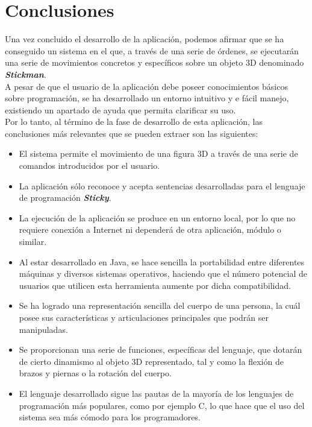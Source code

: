\chapter{Conclusiones}
Una vez concluido el desarrollo de la aplicación, podemos afirmar que se ha conseguido un sistema en el que, a través de una 
serie de órdenes, se ejecutarán una serie de movimientos concretos y específicos sobre un objeto 3D denominado \textbf{\textit{Stickman}}.\\

A pesar de que el usuario de la aplicación debe poseer conocimientos básicos sobre programación, se ha desarrollado un entorno 
intuitivo y e fácil manejo, existiendo un apartado de ayuda que permita clarificar su uso.\\

Por lo tanto, al término de la fase de desarrollo de esta aplicación, las conclusiones más relevantes que se pueden extraer son las siguientes:
\begin{itemize}
   \item El sistema permite el movimiento de una figura 3D a través de una serie de comandos introducidos por el usuario.
   \item La aplicación sólo reconoce y acepta sentencias desarrolladas para el lenguaje de programación \textbf{\textit{Sticky}}.
   \item La ejecución de la aplicación se produce en un entorno local, por lo que no requiere conexión a Internet ni dependerá de otra 
         aplicación, módulo o similar.
   \item Al estar desarrollado en Java, se hace sencilla la portabilidad entre diferentes máquinas y diversos sistemas operativos, haciendo
         que el número potencial de usuarios que utilicen esta herramienta aumente por dicha compatibilidad.
   \item Se ha logrado una representación sencilla del cuerpo de una persona, la cuál posee sus características y articulaciones principales
         que podrán ser manipuladas.
   \item Se proporcionan una serie de funciones, específicas del lenguaje, que dotarán de cierto dinamismo al objeto 3D representado, tal y 
         como la flexión de brazos y piernas o la rotación del cuerpo.
   \item El lenguaje desarrollado sigue las pautas de la mayoría de los lenguajes de programación más populares, como por ejemplo C, lo que
         hace que el uso del sistema sea más cómodo para los programadores.
\end{itemize}

